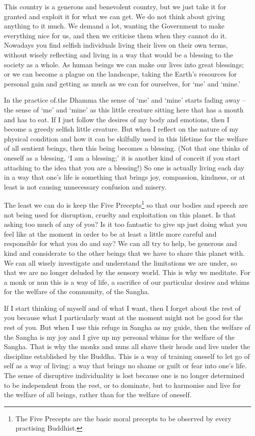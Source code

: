 This country is a generous and benevolent country, but we just take it for granted and exploit it for what we can get. We do not think about giving anything to it much. We demand a lot, wanting the Government to make everything nice for us, and then we criticise them when they cannot do it. Nowadays you find selfish individuals living their lives on their own terms, without wisely reflecting and living in a way that would be a blessing to the society as a whole. As human beings we can make our lives into great blessings; or we can become a plague on the landscape, taking the Earth's resources for personal gain and getting as much as we can for ourselves, for `me' and `mine.'

In the practice of.the Dhamma the sense of `me' and `mine' starts fading away -- the sense of `me' and `mine' as this little creature sitting here that has a mouth and has to eat. If I just follow the desires of my body and emotions, then I become a greedy selfish little creature. But when I reflect on the nature of my physical condition and how it can be skilfully used in this lifetime for the welfare of all sentient beings, then this being becomes a blessing. (Not that one thinks of oneself as a blessing, `I am a blessing;' it is another kind of conceit if you start attaching to the idea that you are a blessing!) So one is actually living each day in a way that one's life is something that brings joy, compassion, kindness, or at least is not causing unnecessary confusion and misery.

The least we can do is keep the Five Precepts\footnote{The Five Precepts are the basic moral precepts to be observed by every practising Buddhist.} so that our bodies and speech are not being used for disruption, cruelty and exploitation on this planet. Is that asking too much of any of you? Is it too fantastic to give up just doing what you feel like at the moment in order to be at least a little more careful and responsible for what you do and say? We can all try to help, be generous and kind and considerate to the other beings that we have to share this planet with. We can all wisely investigate and understand the limitations we are under, so that we are no longer deluded by the sensory world. This is why we meditate. For a monk or nun this is a way of life, a sacrifice of our particular desires and whims for the welfare of the community, of the Sangha.

If I start thinking of myself and of what I want, then I forget about the rest of you because what I particularly want at the moment might not be good for the rest of you. But when I use this refuge in Sangha as my guide, then the welfare of the Sangha is my joy and I give up my personal whims for the welfare of the Sangha. That is why the monks and nuns all shave their heads and live under the discipline established by the Buddha. This is a way of training oneself to let go of self as a way of living: a way that brings no shame or guilt or fear into one's life. The sense of disruptive individuality is lost because one is no longer determined to be independent from the rest, or to dominate, but to harmonise and live for the welfare of all beings, rather than for the welfare of oneself.

